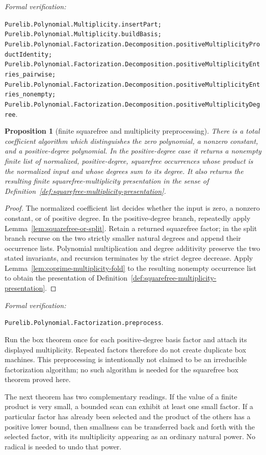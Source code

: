 \documentclass[11pt]{article}
\newtheorem{proposition}[theorem]{Proposition}
\newcommand{\Defref}[1]{Definition~\ref{#1}}
\newcommand{\leanref}[1]{\par\smallskip\noindent
  \emph{Formal verification:}\par\nobreak
  {\raggedright\nolinkurl{#1}.\par}}
\begin{document}
\leanref{Purelib.Polynomial.Multiplicity.insertPart;
Purelib.Polynomial.Multiplicity.buildBasis;
Purelib.Polynomial.Factorization.Decomposition.positiveMultiplicityProductIdentity;
Purelib.Polynomial.Factorization.Decomposition.positiveMultiplicityEntries_pairwise;
Purelib.Polynomial.Factorization.Decomposition.positiveMultiplicityEntries_nonempty;
Purelib.Polynomial.Factorization.Decomposition.positiveMultiplicityDegree}

\begin{proposition}[finite squarefree and multiplicity preprocessing]
\label{prop:factor}
There is a total coefficient algorithm which distinguishes the zero
polynomial, a nonzero constant, and a positive-degree polynomial.  In the
positive-degree case it returns a nonempty finite list of normalized,
positive-degree, squarefree occurrences whose product is the
normalized input and whose degrees sum to its degree.  It also returns the
resulting finite squarefree-multiplicity presentation in the sense of
\Defref{def:squarefree-multiplicity-presentation}.
\end{proposition}

\begin{proof}
The normalized coefficient list decides whether the input is zero, a nonzero
constant, or of positive degree.  In the positive-degree branch, repeatedly
apply Lemma~\ref{lem:squarefree-or-split}.  Retain a returned squarefree factor;
in the split branch recurse on the two strictly smaller natural degrees and
append their occurrence lists.  Polynomial multiplication and degree
additivity preserve the two stated invariants, and recursion
terminates by the strict degree decrease.  Apply
Lemma~\ref{lem:coprime-multiplicity-fold} to the resulting nonempty occurrence
list to obtain the presentation of
\Defref{def:squarefree-multiplicity-presentation}.
\end{proof}

\leanref{Purelib.Polynomial.Factorization.preprocess}

Run the box theorem once for each positive-degree basis factor and attach its displayed multiplicity.  Repeated factors therefore do not create duplicate box machines.  This preprocessing is intentionally not claimed to be an irreducible factorization algorithm; no such algorithm is needed for the squarefree box theorem proved here.

The next theorem has two complementary readings.  If the value of a finite
product is very small, a bounded scan can exhibit at least one small factor.
If a particular factor has already been selected and the product of the
others has a positive lower bound, then smallness can be transferred back and
forth with the selected factor, with its multiplicity appearing as an
ordinary natural power.  No radical is needed to undo that power.
\end{document}
